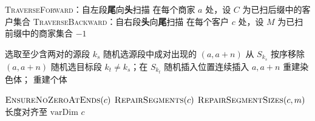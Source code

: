 \documentclass[a4paper]{ctexart}
\newcommand{\varDim}{\text{varDim}}
\begin{document}
\begin{algorithm}[htbp]
\caption{T3 辅助：\texttt{TraverseForward} / \texttt{TraverseBackward}（要点）}
\textsc{TraverseForward}：自左段\textbf{尾}向\textbf{头}扫描\;
\Indp
在每个商家 $a$ 处，设 $C$ 为已扫后缀中的客户集合\;
\Indm
\textsc{TraverseBackward}：自右段\textbf{头}向\textbf{尾}扫描\;
\Indp
在每个客户 $c$ 处，设 $M$ 为已扫前缀中的商家集合\;
\Indm
\Return $-1$\;
\end{algorithm}

\begin{algorithm}[htbp]
\caption{变异 T4：\texttt{Type4\_SegSwap}（跨段迁移完整商家--客户对，示意）}
选取至少含两对的源段 $k_s$\;
随机选源段中成对出现的 $(a,a{+}n)$\;
从 $S_{k_s}$ 按序移除 $(a,a{+}n)$\;
随机选目标段 $k_t \neq k_s$；在 $S_{k_t}$ 随机插入位置连续插入 $a,a{+}n$\;
重建染色体；
\Return 重建个体\;
\end{algorithm}

\begin{algorithm}[htbp]
\caption{段修复流水线 \texttt{OrderSegmentRepair}（抽象）}
$\textsc{EnsureNoZeroAtEnds}(c)$ 
$\textsc{RepairSegments}(c)$ 
$\textsc{RepairSegmentSizes}(c,m)$ 
长度对齐至 $\varDim$\;
\Return $c$\;
\end{algorithm}
\end{document}
